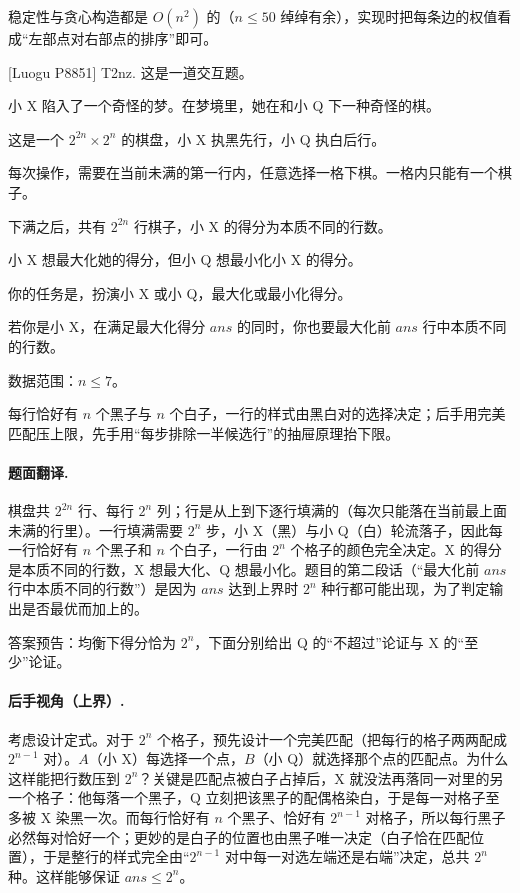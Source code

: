 \cost 稳定性与贪心构造都是 $O(n^2)$ 的（$n\le50$ 绰绰有余），实现时把每条边的权值看成“左部点对右部点的排序”即可。


\begin{problem}{[Luogu P8851] T2nz.}
这是一道交互题。

小 X 陷入了一个奇怪的梦。在梦境里，她在和小 Q 下一种奇怪的棋。

这是一个 $2^{2n}\times 2^{n}$ 的棋盘，小 X 执黑先行，小 Q 执白后行。

每次操作，需要在当前未满的第一行内，任意选择一格下棋。一格内只能有一个棋子。

下满之后，共有 $2^{2n}$ 行棋子，小 X 的得分为本质不同的行数。

小 X 想最大化她的得分，但小 Q 想最小化小 X 的得分。

你的任务是，扮演小 X 或小 Q，最大化或最小化得分。

若你是小 X，在满足最大化得分 $ans$ 的同时，你也要最大化前 $ans$ 行中本质不同的行数。

数据范围：$n\le7$。
\end{problem}

\hint 每行恰好有 $n$ 个黑子与 $n$ 个白子，一行的样式由黑白对的选择决定；后手用完美匹配压上限，先手用“每步排除一半候选行”的抽屉原理抬下限。

\sol \paragraph{题面翻译.} 棋盘共 $2^{2n}$ 行、每行 $2^{n}$ 列；行是从上到下逐行填满的（每次只能落在当前最上面未满的行里）。一行填满需要 $2^{n}$ 步，小 X（黑）与小 Q（白）轮流落子，因此每一行恰好有 $n$ 个黑子和 $n$ 个白子，一行由 $2^{n}$ 个格子的颜色完全决定。X 的得分是本质不同的行数，X 想最大化、Q 想最小化。题目的第二段话（“最大化前 $ans$ 行中本质不同的行数”）是因为 $ans$ 达到上界时 $2^{n}$ 种行都可能出现，为了判定输出是否最优而加上的。

答案预告：均衡下得分恰为 $2^{n}$，下面分别给出 Q 的“不超过”论证与 X 的“至少”论证。

\paragraph{后手视角（上界）.} 考虑设计定式。对于 $2^{n}$ 个格子，预先设计一个完美匹配（把每行的格子两两配成 $2^{n-1}$ 对）。$A$（小 X）每选择一个点，$B$（小 Q）就选择那个点的匹配点。为什么这样能把行数压到 $2^{n}$？关键是匹配点被白子占掉后，X 就没法再落同一对里的另一个格子：他每落一个黑子，Q 立刻把该黑子的配偶格染白，于是每一对格子至多被 X 染黑一次。而每行恰好有 $n$ 个黑子、恰好有 $2^{n-1}$ 对格子，所以每行黑子必然每对恰好一个；更妙的是白子的位置也由黑子唯一决定（白子恰在匹配位置），于是整行的样式完全由“$2^{n-1}$ 对中每一对选左端还是右端”决定，总共 $2^{n}$ 种。这样能够保证 $ans\le2^{n}$。

